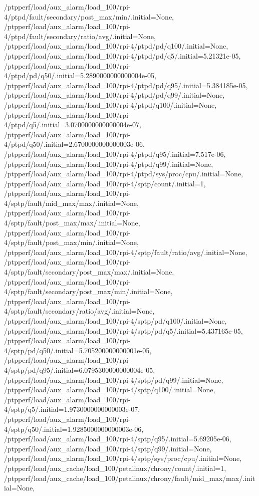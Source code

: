 {    /ptpperf/load/aux_alarm/load_100/rpi-4/ptpd/fault/secondary/post_max/min/.initial=None,
    /ptpperf/load/aux_alarm/load_100/rpi-4/ptpd/fault/secondary/ratio/avg/.initial=None,
    /ptpperf/load/aux_alarm/load_100/rpi-4/ptpd/pd/q100/.initial=None,
    /ptpperf/load/aux_alarm/load_100/rpi-4/ptpd/pd/q5/.initial=5.21321e-05,
    /ptpperf/load/aux_alarm/load_100/rpi-4/ptpd/pd/q50/.initial=5.2890000000000004e-05,
    /ptpperf/load/aux_alarm/load_100/rpi-4/ptpd/pd/q95/.initial=5.384185e-05,
    /ptpperf/load/aux_alarm/load_100/rpi-4/ptpd/pd/q99/.initial=None,
    /ptpperf/load/aux_alarm/load_100/rpi-4/ptpd/q100/.initial=None,
    /ptpperf/load/aux_alarm/load_100/rpi-4/ptpd/q5/.initial=3.0700000000000004e-07,
    /ptpperf/load/aux_alarm/load_100/rpi-4/ptpd/q50/.initial=2.6700000000000003e-06,
    /ptpperf/load/aux_alarm/load_100/rpi-4/ptpd/q95/.initial=7.517e-06,
    /ptpperf/load/aux_alarm/load_100/rpi-4/ptpd/q99/.initial=None,
    /ptpperf/load/aux_alarm/load_100/rpi-4/ptpd/sys/proc/cpu/.initial=None,
    /ptpperf/load/aux_alarm/load_100/rpi-4/sptp/count/.initial=1,
    /ptpperf/load/aux_alarm/load_100/rpi-4/sptp/fault/mid_max/max/.initial=None,
    /ptpperf/load/aux_alarm/load_100/rpi-4/sptp/fault/post_max/max/.initial=None,
    /ptpperf/load/aux_alarm/load_100/rpi-4/sptp/fault/post_max/min/.initial=None,
    /ptpperf/load/aux_alarm/load_100/rpi-4/sptp/fault/ratio/avg/.initial=None,
    /ptpperf/load/aux_alarm/load_100/rpi-4/sptp/fault/secondary/post_max/max/.initial=None,
    /ptpperf/load/aux_alarm/load_100/rpi-4/sptp/fault/secondary/post_max/min/.initial=None,
    /ptpperf/load/aux_alarm/load_100/rpi-4/sptp/fault/secondary/ratio/avg/.initial=None,
    /ptpperf/load/aux_alarm/load_100/rpi-4/sptp/pd/q100/.initial=None,
    /ptpperf/load/aux_alarm/load_100/rpi-4/sptp/pd/q5/.initial=5.437165e-05,
    /ptpperf/load/aux_alarm/load_100/rpi-4/sptp/pd/q50/.initial=5.705200000000001e-05,
    /ptpperf/load/aux_alarm/load_100/rpi-4/sptp/pd/q95/.initial=6.0795300000000004e-05,
    /ptpperf/load/aux_alarm/load_100/rpi-4/sptp/pd/q99/.initial=None,
    /ptpperf/load/aux_alarm/load_100/rpi-4/sptp/q100/.initial=None,
    /ptpperf/load/aux_alarm/load_100/rpi-4/sptp/q5/.initial=1.9730000000000003e-07,
    /ptpperf/load/aux_alarm/load_100/rpi-4/sptp/q50/.initial=1.9285000000000003e-06,
    /ptpperf/load/aux_alarm/load_100/rpi-4/sptp/q95/.initial=5.69205e-06,
    /ptpperf/load/aux_alarm/load_100/rpi-4/sptp/q99/.initial=None,
    /ptpperf/load/aux_alarm/load_100/rpi-4/sptp/sys/proc/cpu/.initial=None,
    /ptpperf/load/aux_cache/load_100/petalinux/chrony/count/.initial=1,
    /ptpperf/load/aux_cache/load_100/petalinux/chrony/fault/mid_max/max/.initial=None,
}
